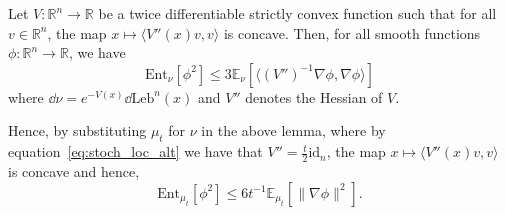 \begin{lemma}
  Let \(V : \mathbb{R}^n \to \mathbb{R}\) be a twice differentiable strictly convex function such that for all 
  \(v \in \mathbb{R}^n\), the map \(x \mapsto \langle V''(x) v, v\rangle\) is concave. Then, for all smooth functions
  \(\phi : \mathbb{R}^n \to \mathbb{R}\), we have 
  \[\text{Ent}_\nu[\phi^2] \le 3\mathbb{E}_\nu[\langle (V'')^{-1} \nabla\phi, \nabla \phi\rangle]\]
  where \(\dd \nu = e^{-V(x)} \dd \text{Leb}^n(x)\) and \(V''\) denotes the Hessian of \(V\).
\end{lemma}

Hence, by substituting \(\mu_t\) for \(\nu\) in the above lemma, where by equation~\eqref{eq:stoch_loc_alt}
we have that \(V'' = \frac{t}{2} \text{id}_n\), the map \(x \mapsto \langle V''(x) v, v\rangle\) is concave 
and hence, 
\[\text{Ent}_{\mu_t}[\phi^2] \le 6t^{-1}\mathbb{E}_{\mu_t}[\|\nabla\phi\|^2].\]